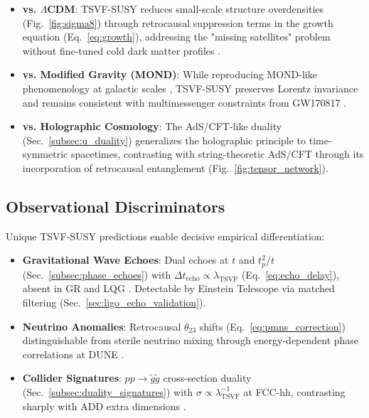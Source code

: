 \documentclass[twocolumn,superscriptaddress,floatfix]{revtex4-2}
\begin{document}
\begin{itemize}
\item \textbf{vs. $\Lambda$CDM}: TSVF-SUSY reduces small-scale structure overdensities (Fig.~\ref{fig:sigma8}) through retrocausal suppression terms in the growth equation (Eq.~\ref{eq:growth}), addressing the "missing satellites" problem \cite{Klypin1999} without fine-tuned cold dark matter profiles \cite{Bullock2017}.

\item \textbf{vs. Modified Gravity (MOND)}: While reproducing MOND-like phenomenology at galactic scales \cite{McGaugh2016}, TSVF-SUSY preserves Lorentz invariance and remains consistent with multimessenger constraints from GW170817 \cite{Ezquiaga2018}.

\item \textbf{vs. Holographic Cosmology}: The AdS/CFT-like duality (Sec.~\ref{subsec:u_duality}) generalizes the holographic principle \cite{Bousso2002} to time-symmetric spacetimes, contrasting with string-theoretic AdS/CFT \cite{Maldacena1999} through its incorporation of retrocausal entanglement (Fig.~\ref{fig:tensor_network}).
\end{itemize}

\subsection{Observational Discriminators}
\label{subsec:discriminators}

Unique TSVF-SUSY predictions enable decisive empirical differentiation:

\begin{itemize}
\item \textbf{Gravitational Wave Echoes}: Dual echoes at $t$ and $t_p^2/t$ (Sec.~\ref{subsec:phase_echoes}) with $\Delta t_{\text{echo}} \propto \lambda_{\text{TSVF}}$ (Eq.~\ref{eq:echo_delay}), absent in GR and LQG \cite{Abedi2017}. Detectable by Einstein Telescope via matched filtering (Sec.~\ref{sec:ligo_echo_validation}).

\item \textbf{Neutrino Anomalies}: Retrocausal $\theta_{23}$ shifts (Eq.~\ref{eq:pmns_correction}) distinguishable from sterile neutrino mixing \cite{Dentler2018} through energy-dependent phase correlations at DUNE \cite{Abi2021}.

\item \textbf{Collider Signatures}: $pp \to \tilde{g}\tilde{g}$ cross-section duality (Sec.~\ref{subsec:duality_signatures}) with $\sigma \propto \lambda_{\text{TSVF}}^{-1}$ at FCC-hh, contrasting sharply with ADD extra dimensions \cite{ArkaniHamed1998}.
\end{itemize}
\end{document}
